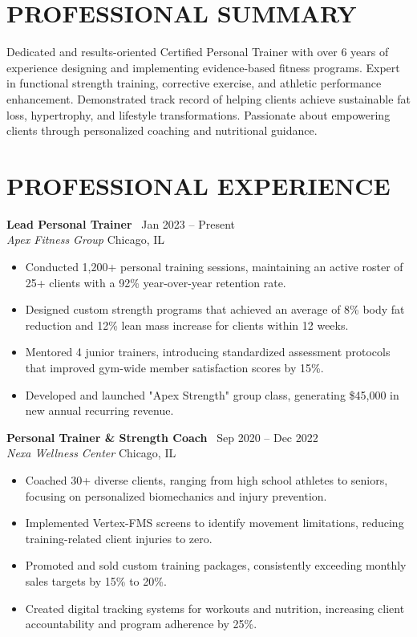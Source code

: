 \documentclass[10pt]{article}
\newcommand{\job}[4]{
  \vspace{6pt}
  {\bfseries\color{primary}#1} \hfill {\color{bodytext}\small\faCalendar\ #2} \\
  {\itshape\color{accent}#3} \hfill {\color{bodytext}\small #4}
  \vspace{2pt}
}
\begin{document}
\begin{minipage}[t]{0.68\textwidth}
  \raggedright
  
  \section*{PROFESSIONAL SUMMARY}
  \vspace{4pt}
  {\color{bodytext}
  Dedicated and results-oriented Certified Personal Trainer with over 6 years of experience designing and implementing evidence-based fitness programs. Expert in functional strength training, corrective exercise, and athletic performance enhancement. Demonstrated track record of helping clients achieve sustainable fat loss, hypertrophy, and lifestyle transformations. Passionate about empowering clients through personalized coaching and nutritional guidance.
  }
  
  \section*{PROFESSIONAL EXPERIENCE}
  
  \job{Lead Personal Trainer}{Jan 2023 -- Present}{Apex Fitness Group}{Chicago, IL}
  \begin{itemize}
    \item Conducted 1,200+ personal training sessions, maintaining an active roster of 25+ clients with a 92\% year-over-year retention rate.
    \item Designed custom strength programs that achieved an average of 8\% body fat reduction and 12\% lean mass increase for clients within 12 weeks.
    \item Mentored 4 junior trainers, introducing standardized assessment protocols that improved gym-wide member satisfaction scores by 15\%.
    \item Developed and launched "Apex Strength" group class, generating \$45,000 in new annual recurring revenue.
  \end{itemize}
  
  \job{Personal Trainer \& Strength Coach}{Sep 2020 -- Dec 2022}{Nexa Wellness Center}{Chicago, IL}
  \begin{itemize}
    \item Coached 30+ diverse clients, ranging from high school athletes to seniors, focusing on personalized biomechanics and injury prevention.
    \item Implemented Vertex-FMS screens to identify movement limitations, reducing training-related client injuries to zero.
    \item Promoted and sold custom training packages, consistently exceeding monthly sales targets by 15\% to 20\%.
    \item Created digital tracking systems for workouts and nutrition, increasing client accountability and program adherence by 25\%.
  \end{itemize}
  

\end{minipage}
\end{document}
